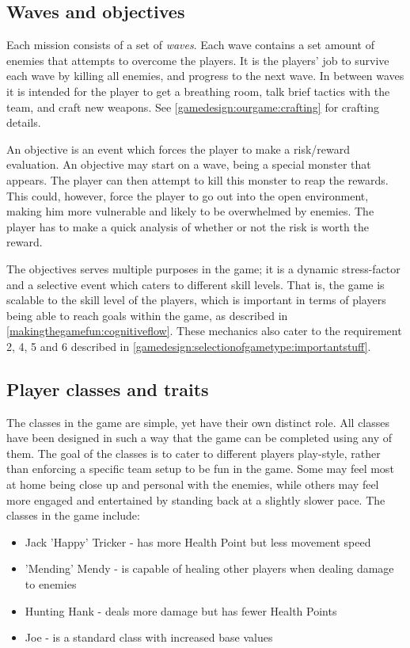 \subsection{Waves and objectives}\label{gamedesign:ourgame:objectives}
Each mission consists of a set of \emph{waves}. Each wave contains a set amount of enemies that attempts to overcome the players. It is the players' job to survive each wave by killing all enemies, and progress to the next wave. In between waves it is intended for the player to get a breathing room, talk brief tactics with the team, and craft new weapons. See \ref{gamedesign:ourgame:crafting} for crafting details. 

An objective is an event which forces the player to make a risk/reward evaluation.
An objective may start on a wave, being a special monster that appears.
The player can then attempt to kill this monster to reap the rewards.
This could, however, force the player to go out into the open environment, making him more vulnerable and likely to be overwhelmed by enemies. The player has to make a quick analysis of whether or not the risk is worth the reward.

The objectives serves multiple purposes in the game; it is a dynamic
stress-factor and a selective event which caters to different skill levels.
That is, the game is scalable to the skill level of the players, which is important in terms of players being able to reach goals within the game, as described in \ref{makingthegamefun:cognitiveflow}.
These mechanics also cater to the requirement 2, 4, 5 and 6 described in \ref{gamedesign:selectionofgametype:importantstuff}.

\subsection{Player classes and traits}\label{gamedesign:ourgame:classes}
The classes in the game are simple, yet have their own distinct role.
All classes have been designed in such a way that the game can be completed using any of them.
The goal of the classes is to cater to different players play-style, rather than enforcing a specific team setup to be fun in the game.
Some may feel most at home being close up and personal with the enemies, while others may feel more engaged and entertained by standing back at a slightly slower pace.
The classes in the game include:

\begin{itemize}
\item Jack 'Happy' Tricker - has more Health Point but less movement speed
\item 'Mending' Mendy - is capable of healing other players when dealing damage to enemies
\item Hunting Hank - deals more damage but has fewer Health Points
\item Joe - is a standard class with increased base values
\end{itemize}

